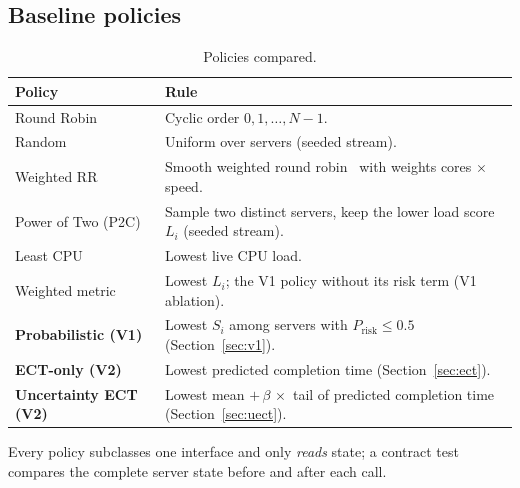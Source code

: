 \documentclass[11pt,a4paper]{article}
\newcommand{\prisk}{P_{\mathrm{risk}}}
\begin{document}
\subsection{Baseline policies}
\begin{table}[H]
\caption{Policies compared.}\label{tab:policies}
\begin{tabularx}{\linewidth}{lY}
\toprule
\textbf{Policy} & \textbf{Rule}\\
\midrule
Round Robin & Cyclic order $0,1,\dots,N-1$.\\
Random & Uniform over servers (seeded stream).\\
Weighted RR & Smooth weighted round robin~\cite{nginx} with weights cores $\times$ speed.\\
Power of Two (P2C) & Sample two distinct servers, keep the lower load score $L_i$ (seeded stream).\\
Least CPU & Lowest live CPU load.\\
Weighted metric & Lowest $L_i$; the V1 policy without its risk term (V1 ablation).\\
\textbf{Probabilistic (V1)} & Lowest $S_i$ among servers with $\prisk \le 0.5$ (Section~\ref{sec:v1}).\\
\textbf{ECT-only (V2)} & Lowest predicted completion time (Section~\ref{sec:ect}).\\
\textbf{Uncertainty ECT (V2)} & Lowest mean $+\,\beta\,\times$ tail of predicted completion time (Section~\ref{sec:uect}).\\
\bottomrule
\end{tabularx}
\end{table}
Every policy subclasses one interface and only \emph{reads} state; a contract test compares the complete
server state before and after each call.
\end{document}
